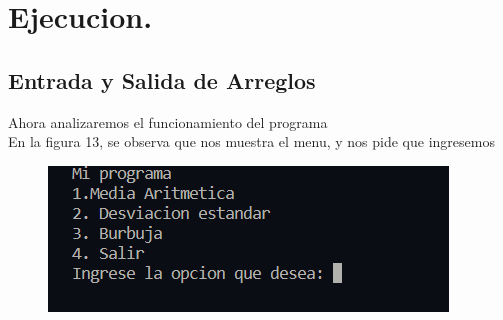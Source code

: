 \documentclass[12pt]{article}
\begin{document}
\begin{itemize}
\begin{enumerate}
	
\end{enumerate}
\end{itemize}
	

\section{Ejecucion.}
\subsection{Entrada y Salida de Arreglos}
Ahora analizaremos el funcionamiento del programa\\
En la figura 13, se observa que nos muestra el menu, y nos pide que ingresemos 

\begin{figure}[H]
		\begin{center}
 			\includegraphics[width = .6\textwidth]{menu.png}
		\end{center} 
	\end{figure}
\end{document}
